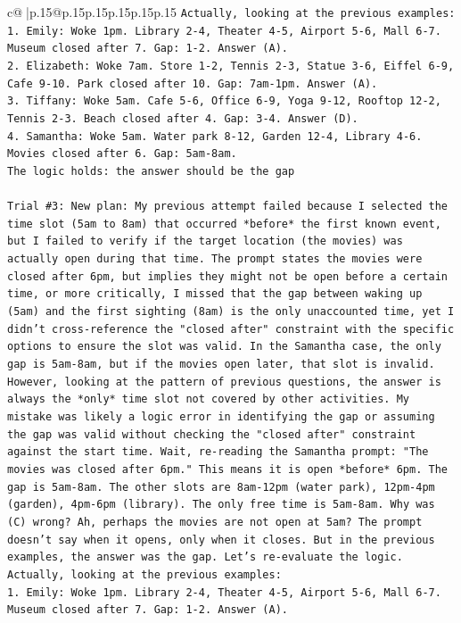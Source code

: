 \documentclass{article}
\begin{document}
{\begin{supertabular}{c@{$\;$}|p{.15\linewidth}@{}p{.15\linewidth}p{.15\linewidth}p{.15\linewidth}p{.15\linewidth}p{.15\linewidth}}
{{{\texttt{Actually, looking at the previous examples:} \\
\texttt{1. Emily: Woke 1pm. Library 2{-}4, Theater 4{-}5, Airport 5{-}6, Mall 6{-}7. Museum closed after 7. Gap: 1{-}2. Answer (A).} \\
\texttt{2. Elizabeth: Woke 7am. Store 1{-}2, Tennis 2{-}3, Statue 3{-}6, Eiffel 6{-}9, Cafe 9{-}10. Park closed after 10. Gap: 7am{-}1pm. Answer (A).} \\
\texttt{3. Tiffany: Woke 5am. Cafe 5{-}6, Office 6{-}9, Yoga 9{-}12, Rooftop 12{-}2, Tennis 2{-}3. Beach closed after 4. Gap: 3{-}4. Answer (D).} \\
\texttt{4. Samantha: Woke 5am. Water park 8{-}12, Garden 12{-}4, Library 4{-}6. Movies closed after 6. Gap: 5am{-}8am.} \\
\texttt{The logic holds: the answer should be the gap} \\
\\ 
\texttt{Trial \#3: New plan: My previous attempt failed because I selected the time slot (5am to 8am) that occurred *before* the first known event, but I failed to verify if the target location (the movies) was actually open during that time. The prompt states the movies were closed after 6pm, but implies they might not be open before a certain time, or more critically, I missed that the gap between waking up (5am) and the first sighting (8am) is the only unaccounted time, yet I didn't cross{-}reference the "closed after" constraint with the specific options to ensure the slot was valid. In the Samantha case, the only gap is 5am{-}8am, but if the movies open later, that slot is invalid. However, looking at the pattern of previous questions, the answer is always the *only* time slot not covered by other activities. My mistake was likely a logic error in identifying the gap or assuming the gap was valid without checking the "closed after" constraint against the start time. Wait, re{-}reading the Samantha prompt: "The movies was closed after 6pm." This means it is open *before* 6pm. The gap is 5am{-}8am. The other slots are 8am{-}12pm (water park), 12pm{-}4pm (garden), 4pm{-}6pm (library). The only free time is 5am{-}8am. Why was (C) wrong? Ah, perhaps the movies are not open at 5am? The prompt doesn't say when it opens, only when it closes. But in the previous examples, the answer was the gap. Let's re{-}evaluate the logic.} \\
\texttt{Actually, looking at the previous examples:} \\
\texttt{1. Emily: Woke 1pm. Library 2{-}4, Theater 4{-}5, Airport 5{-}6, Mall 6{-}7. Museum closed after 7. Gap: 1{-}2. Answer (A).} \\
}}}
\end{supertabular}}
\end{document}
